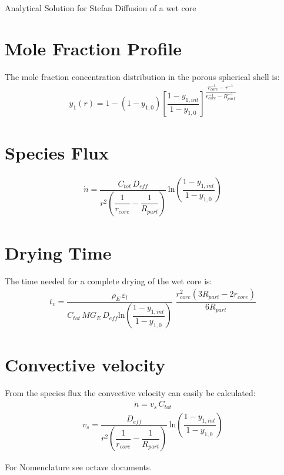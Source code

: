 \documentclass{article}
\begin{document}

\begin{center}
\LARGE
Analytical Solution for Stefan Diffusion of a wet core
\end{center} 

\section{Mole Fraction Profile}
The mole fraction concentration distribution in the porous spherical shell is:
\begin{align}
y_1(r) = 1 - (1 - y_{1,0}) \left[\dfrac{1 - y_{1,int}}{1 - y_{1,0}} \right]^{\dfrac{r_{core}^{-1} - r^{-1}}{r_{core}^{-1} - R_{part}^{-1}}}
\end{align}

\section{Species Flux}
\begin{align}
\dot{n} = \dfrac{C_{tot} \, D_{eff}}{r^2 \left( \dfrac{1}{r_{core}} - \dfrac{1}{R_{part}}\right)} \, \text{ln} \left( \dfrac{1-y_{1,int}}{1-y_{1,0}} \right)
\end{align}

\section{Drying Time}
The time needed for a complete drying of the wet core is:
\begin{align}
t_v = \dfrac{\rho_E \, \varepsilon_l}{C_{tot}\, MG_E \, D_{eff} \text{ln} \left(\dfrac{1 - y_{1,int}}{1 - y_{1,0}} \right)}  \, \, \dfrac{r_{core}^2 (3 R_{part} - 2 r_{core})}{6 R_{part}}
\end{align}

\section{Convective velocity}
From the species flux the convective velocity can easily be calculated:
\begin{align}
\dot{n} = v_s \, C_{tot} 
\end{align}
\begin{align}
v_s = \dfrac{D_{eff}}{r^2 \left( \dfrac{1}{r_{core}} - \dfrac{1}{R_{part}}\right)} \, \text{ln} \left( \dfrac{1-y_{1,int}}{1-y_{1,0}} \right)
\end{align}

For Nomenclature see octave documents.
\end{document}
